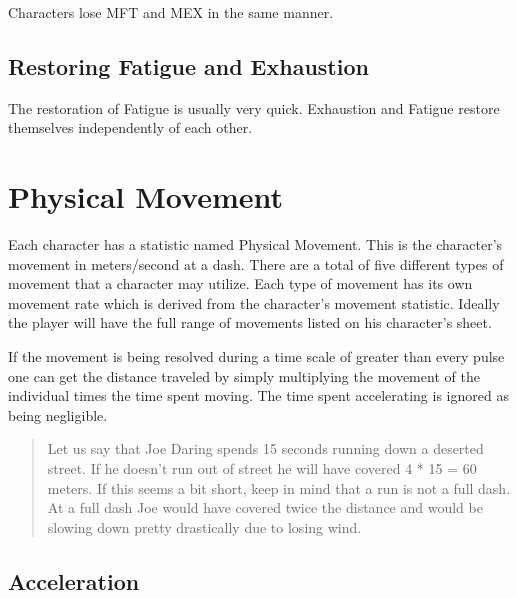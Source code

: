 

Characters lose MFT and MEX in the same manner.



\subsection{Restoring Fatigue and Exhaustion}

The restoration of Fatigue is usually very quick. Exhaustion and Fatigue
restore themselves independently of each other.



\section{Physical Movement}

Each character has a statistic named Physical Movement. This is the character's
movement in meters/second at a dash. There are a total of five different types
of movement that a character may utilize. Each type of movement has its own
movement rate which is derived from the character's movement statistic. 
Ideally the player will have the full range of movements listed on his 
character's sheet. 



If the movement is being resolved during a time scale of greater than every
pulse one can get the distance traveled by simply multiplying the movement 
of the individual times the time spent moving. The time spent accelerating
is ignored as being negligible.

\begin{quote}
Let us say that Joe Daring spends 15 seconds running down a deserted street.
If he doesn't run out of street he will have covered 4 * 15 = 60 meters. If 
this seems a bit short, keep in mind that a run is not a full dash. At a full
dash Joe would have covered twice the distance and would be slowing down pretty 
drastically due to losing wind.
\end{quote}

\subsection{Acceleration}


